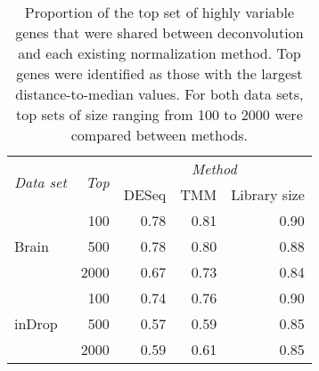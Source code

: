 \documentclass{article}
\begin{document}
\begin{table}[p]
    \caption{ 
        Proportion of the top set of highly variable genes that were shared between deconvolution and each existing normalization method.
        Top genes were identified as those with the largest distance-to-median values. 
        For both data sets, top sets of size ranging from 100 to 2000 were compared between methods.
    }
    \begin{center}
        \begin{tabular}{l r r r r}
            \hline
            \multirow{2}{*}{\textit{Data set}} & \multirow{2}{*}{\textit{Top}} & \multicolumn{3}{c}{\textit{Method}} \\
                \cline{3-5}
                & & DESeq & TMM & Library size \\
            \hline
            \multirow{3}{*}{Brain}            
            & 100  & 0.78 & 0.81 & 0.90 \\ 
            & 500  & 0.78 & 0.80 & 0.88 \\
            & 2000 & 0.67 & 0.73 & 0.84 \\
            \hline
            \multirow{3}{*}{inDrop}            
            & 100  & 0.74 & 0.76 & 0.90 \\ 
            & 500  & 0.57 & 0.59 & 0.85 \\
            & 2000 & 0.59 & 0.61 & 0.85 \\
            \hline
        \end{tabular}
    \end{center}
\end{table}
\end{document}

